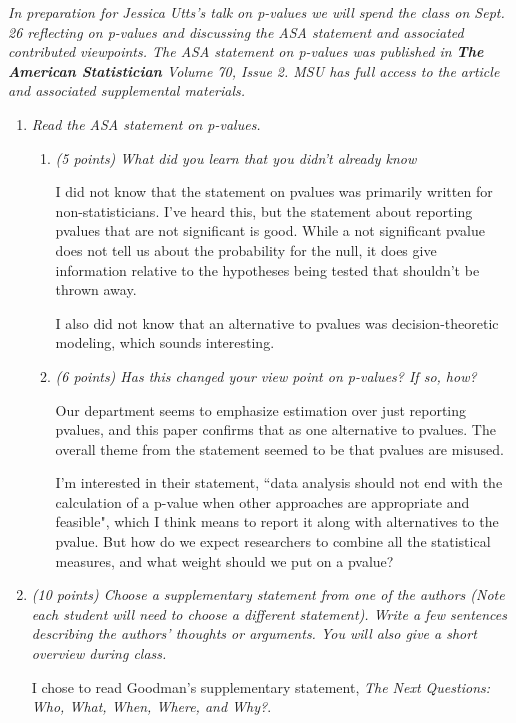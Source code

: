 \documentclass{article}\usepackage[]{graphicx}\usepackage[]{color}
\begin{document}
{\it In preparation for Jessica Utts's talk on p-values we will spend the class on Sept. 26 reflecting
on p-values and discussing the ASA statement and associated contributed viewpoints. The ASA statement on p-values was published in {\bf The American Statistician} Volume 70, Issue 2. MSU has full access to the article and associated supplemental materials.}
\begin{enumerate}
\item%
{\it Read the ASA statement on p-values.}

\begin{enumerate}
\item%
{\it (5 points) What did you learn that you didn't already know}

I did not know that the statement on pvalues was primarily written for non-statisticians. I've heard this, but the statement about reporting pvalues that are not significant is good. While a not significant pvalue does not tell us about the probability for the null, it does give information relative to the hypotheses being tested that shouldn't be thrown away.

I also did not know that an alternative to pvalues was decision-theoretic modeling, which sounds interesting.

\item%
{\it (6 points) Has this changed your view point on p-values? If so, how?}

Our department seems to emphasize estimation over just reporting pvalues, and this paper confirms that as one alternative to pvalues. The overall theme from the statement seemed to be that pvalues are misused.

I'm interested in their statement, ``data analysis should not end with the calculation
of a p-value when other approaches are appropriate and feasible", which I think means to report it along with alternatives to the pvalue. But how do we expect researchers to combine all the statistical measures, and what weight should we put on a pvalue?


\end{enumerate}

\item {\it (10 points) Choose a supplementary statement from one of the authors (Note each student will
need to choose a different statement). Write a few sentences describing the authors' thoughts or arguments. You will also give a short overview during class.}

I chose to read Goodman's supplementary statement, {\it The Next Questions: Who, What, When, Where, and Why?}. 


\end{enumerate}
\end{document}
